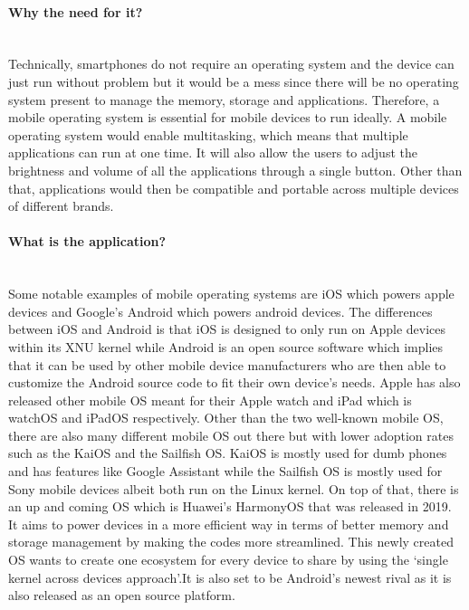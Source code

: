 \documentclass[conference]{IEEEtran}
\begin{document}
\paragraph{Why the need for it?}\mbox{} \\
Technically, smartphones do not require an operating system and the device can just run without problem but it would be a mess since there will be no operating system present to manage the memory, storage and applications. Therefore, a mobile operating system is essential for mobile devices to run ideally. A mobile operating system would enable multitasking, which means that multiple applications can run at one time. It will also allow the users to adjust the brightness and volume of all the applications through a single button. Other than that, applications would then be compatible and portable across multiple devices of different brands.
\\
\paragraph{What is the application?}\mbox{} \\
Some notable examples of mobile operating systems are iOS which powers apple devices and Google’s Android which powers android devices. The differences between iOS and Android is that iOS is designed to only run on Apple devices within its XNU kernel while Android is an open source software which implies that it can be used by other mobile device manufacturers who are then able to customize the Android source code to fit their own device’s needs. Apple has also released other mobile OS meant for their Apple watch and iPad which is watchOS and iPadOS respectively. Other than the two well-known mobile OS, there are also many different mobile OS out there but with lower adoption rates such as the KaiOS and the Sailfish OS. KaiOS is mostly used for dumb phones and has features like Google Assistant while the Sailfish OS is mostly used for Sony mobile devices albeit both run on the Linux kernel. On top of that, there is an up and coming OS which is Huawei’s HarmonyOS that was released in 2019. It aims to power devices in a more efficient way in terms of better memory and storage management by making the codes more streamlined. This newly created OS wants to create one ecosystem for every device to share by using the ‘single kernel across devices approach’.It is also set to be Android’s newest rival as it is also released as an open source platform.
\end{document}
